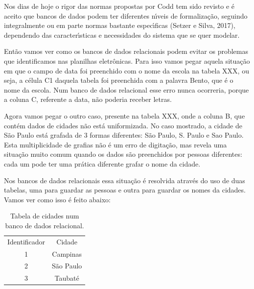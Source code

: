 \documentclass[
12pt,		%
openright,	%
twoside,  %
a4paper,			%
chapter=TITLE,		%
english,			%
french,				%
spanish,			%
brazil				%
]{USPSC-classe/USPSC}
\begin{document}
Nos dias de hoje o rigor das normas propostas por Codd tem sido revisto e \'e aceito que bancos de dados podem ter diferentes n\'{\i}veis de formaliza\c{c}\~ao, seguindo integralmente ou em parte normas bastante espec\'{\i}ficas (Setzer e Silva, 2017), dependendo das caracter\'{\i}sticas e necessidades do sistema que se quer modelar.










Ent\~ao vamos ver como os bancos de dados relacionais podem evitar os problemas que identificamos nas planilhas eletr\^onicas. Para isso vamos pegar aquela situa\c{c}\~ao em que o campo de data foi preenchido com o nome da escola na tabela XXX, ou seja, a c\'elula C1 daquela tabela foi preenchida com a palavra \textquotedbl Bento\textquotedbl , que \'e o nome da escola. Num banco de dados relacional esse erro nunca ocorreria, porque a coluna C, referente a data, n\~ao poderia receber letras.










Agora vamos pegar o outro caso, presente na tabela XXX, onde a coluna B, que cont\'em dados de cidades n\~ao est\'a uniformizada. No caso mostrado, a cidade de S\~ao Paulo est\'a grafada de 3 formas diferentes: S\~ao Paulo, S. Paulo e Sao Paulo. Esta multiplicidade de grafias n\~ao \'e um erro de digita\c{c}\~ao, mas revela uma situa\c{c}\~ao muito comum quando os dados s\~ao preenchidos por pessoas diferentes: cada um pode ter uma pr\'atica diferente grafar o nome da cidade.










Nos bancos de dados relacionais essa situa\c{c}\~ao \'e resolvida atrav\'es do uso de duas tabelas, uma para guardar as pessoas e outra para guardar os nomes da cidades. Vamos ver como isso \'e feito abaixo:














\begin{table}[htb]
\tiny
\caption{\label{e4d91173469576e32f3571663aaeb94e34415b3e}Tabela de cidades num banco de dados relacional.}

\centering
\begin{tabular}{|c|c|}
\hline
Identificador  &  Cidade \\
1  &  Campinas \\
2  &  S\~ao Paulo \\
3  &  Taubat\'e \\
\hline
\end{tabular}
\end{table}
\end{document}
